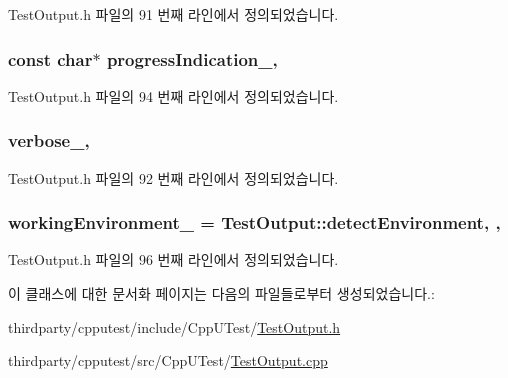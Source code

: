 Test\+Output.\+h 파일의 91 번째 라인에서 정의되었습니다.

\subsubsection[{\texorpdfstring{progress\+Indication\+\_\+}{progressIndication_}}]{\setlength{\rightskip}{0pt plus 5cm}const char$\ast$ progress\+Indication\+\_\+\hspace{0.3cm}{\ttfamily [protected]}, {\ttfamily [inherited]}}\hypertarget{class_test_output_a4cbc8ea3886624399ab3879767d4f018}{}\label{class_test_output_a4cbc8ea3886624399ab3879767d4f018}


Test\+Output.\+h 파일의 94 번째 라인에서 정의되었습니다.

\subsubsection[{\texorpdfstring{verbose\+\_\+}{verbose_}}]{ verbose\+\_\+\hspace{0.3cm}{\ttfamily [protected]}, {\ttfamily [inherited]}}\hypertarget{class_test_output_a86126da532c138842a42d8e9a52b0806}{}\label{class_test_output_a86126da532c138842a42d8e9a52b0806}


Test\+Output.\+h 파일의 92 번째 라인에서 정의되었습니다.

\subsubsection[{\texorpdfstring{working\+Environment\+\_\+}{workingEnvironment_}}]{ working\+Environment\+\_\+ = {\bf Test\+Output\+::detect\+Environment}\hspace{0.3cm}{\ttfamily [static]}, {\ttfamily [protected]}, {\ttfamily [inherited]}}\hypertarget{class_test_output_a8b622cfce4b95599cd31b61a777d68ef}{}\label{class_test_output_a8b622cfce4b95599cd31b61a777d68ef}


Test\+Output.\+h 파일의 96 번째 라인에서 정의되었습니다.



이 클래스에 대한 문서화 페이지는 다음의 파일들로부터 생성되었습니다.\+:\begin{DoxyCompactItemize}
\item 
thirdparty/cpputest/include/\+Cpp\+U\+Test/\hyperlink{_test_output_8h}{Test\+Output.\+h}\item 
thirdparty/cpputest/src/\+Cpp\+U\+Test/\hyperlink{_test_output_8cpp}{Test\+Output.\+cpp}\end{DoxyCompactItemize}

